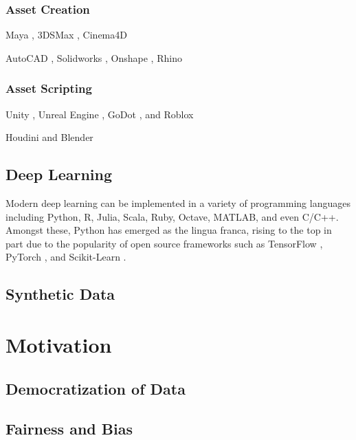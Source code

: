 \documentclass{article}
\begin{document}
\subsubsection{Asset Creation}

Maya \citep{maya}, 3DSMax \citep{3dsmax}, Cinema4D \citep{cinema4d}

AutoCAD \citep{autocad}, Solidworks \citep{solidworks}, Onshape \citep{onshape}, Rhino \citep{rhino}

\subsubsection{Asset Scripting}

Unity \citep{unity3d}, Unreal Engine \citep{unrealengine}, GoDot \citep{godot}, and Roblox \citep{roblox}

Houdini \citep{houdini} and Blender \citep{blender}

\subsection{Deep Learning}

Modern deep learning can be implemented in a variety of programming languages including Python, R, Julia,
 Scala, Ruby, Octave, MATLAB, and even C/C++. Amongst these, Python has emerged as the lingua franca,
  rising to the top in part due to the popularity of open source frameworks such as
  TensorFlow \citep{tensorflow}, PyTorch \citep{pytorch}, and Scikit-Learn \citep{scikit-learn}.

\subsection{Synthetic Data}
\lipsum[5]

\section{Motivation}
\label{sec:motivation}

\subsection{Democratization of Data}
\lipsum[2]

\subsection{Fairness and Bias}
\lipsum[2]
\end{document}
